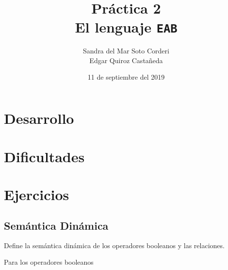 \documentclass{article}
\title {
    Práctica 2 \\
    El lenguaje \texttt{EAB} \\
}
\author {
    Sandra del Mar Soto Corderi \\
    Edgar Quiroz Castañeda
}
\date {
    11 de septiembre del 2019
}
\begin{document}
    \maketitle

    \section{Desarrollo}
    \section{Dificultades}
    \section{Ejercicios}
    \subsection{Semántica Dinámica}
    Define la semántica dinámica de los operadores booleanos y las relaciones.

    Para los operadores booleanos
\end{document}
